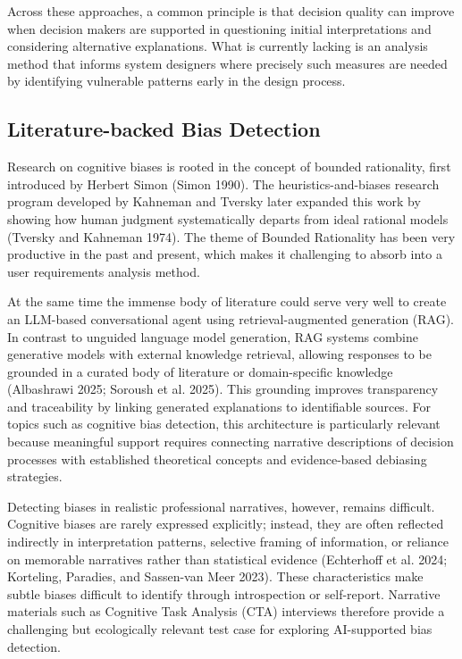 \documentclass[
  letterpaper,
  DIV=11,
  numbers=noendperiod]{scrartcl}
\begin{document}
Across these approaches, a common principle is that decision quality can
improve when decision makers are supported in questioning initial
interpretations and considering alternative explanations. What is
currently lacking is an analysis method that informs system designers
where precisely such measures are needed by identifying vulnerable
patterns early in the design process.

\subsection{Literature-backed Bias
Detection}\label{literature-backed-bias-detection}

Research on cognitive biases is rooted in the concept of bounded
rationality, first introduced by Herbert Simon (Simon 1990). The
heuristics-and-biases research program developed by Kahneman and Tversky
later expanded this work by showing how human judgment systematically
departs from ideal rational models (Tversky and Kahneman 1974). The
theme of Bounded Rationality has been very productive in the past and
present, which makes it challenging to absorb into a user requirements
analysis method.

At the same time the immense body of literature could serve very well to
create an LLM-based conversational agent using retrieval-augmented
generation (RAG). In contrast to unguided language model generation, RAG
systems combine generative models with external knowledge retrieval,
allowing responses to be grounded in a curated body of literature or
domain-specific knowledge (Albashrawi 2025; Soroush et al. 2025). This
grounding improves transparency and traceability by linking generated
explanations to identifiable sources. For topics such as cognitive bias
detection, this architecture is particularly relevant because meaningful
support requires connecting narrative descriptions of decision processes
with established theoretical concepts and evidence-based debiasing
strategies.

Detecting biases in realistic professional narratives, however, remains
difficult. Cognitive biases are rarely expressed explicitly; instead,
they are often reflected indirectly in interpretation patterns,
selective framing of information, or reliance on memorable narratives
rather than statistical evidence (Echterhoff et al. 2024; Korteling,
Paradies, and Sassen-van Meer 2023). These characteristics make subtle
biases difficult to identify through introspection or self-report.
Narrative materials such as Cognitive Task Analysis (CTA) interviews
therefore provide a challenging but ecologically relevant test case for
exploring AI-supported bias detection.
\end{document}
